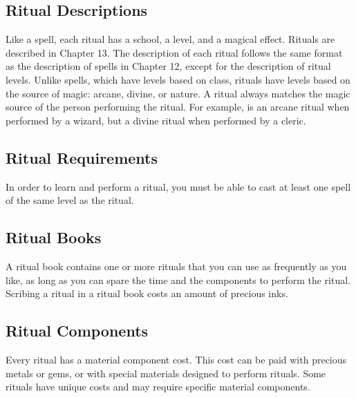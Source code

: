     \subsection{Ritual Descriptions}
        \par Like a spell, each ritual has a school, a level, and a magical effect. Rituals are described in Chapter 13. The description of each ritual follows the same format as the description of spells in Chapter 12, except for the description of ritual levels. Unlike spells, which have levels based on class, rituals have levels based on the source of magic: arcane, divine, or nature. A ritual always matches the magic source of the person performing the ritual. For example,  is an arcane ritual when performed by a wizard, but a divine ritual when performed by a cleric.
    \subsection{Ritual Requirements} In order to learn and perform a ritual, you must be able to cast at least one spell of the same level as the ritual.
    \subsection{Ritual Books}
        A ritual book contains one or more rituals that you can use as frequently as you like, as long as you can spare the time and the components to perform the ritual. Scribing a ritual in a ritual book costs an amount of precious inks.
    \subsection{Ritual Components}
        Every ritual has a material component cost. This cost can be paid with precious metals or gems, or with special materials designed to perform rituals. Some rituals have unique costs and may require specific material components.
